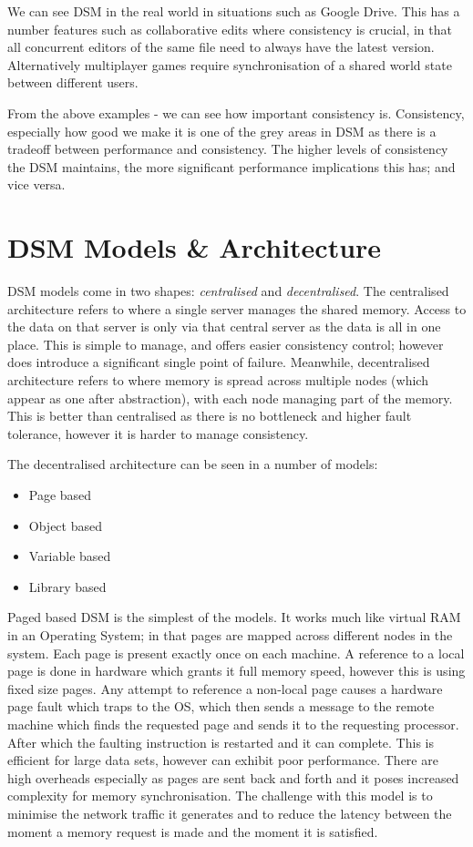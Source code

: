 We can see DSM in the real world in situations such as Google Drive. This has a number features such as collaborative edits where consistency is crucial, in that all concurrent editors of the same file need to always have the latest version. Alternatively multiplayer games require synchronisation of a shared world state between different users. 

From the above examples - we can see how important consistency is. Consistency, especially how good we make it is one of the grey areas in DSM as there is a tradeoff between performance and consistency. The higher levels of consistency the DSM maintains, the more significant performance implications this has; and vice versa. 

\section{DSM Models \& Architecture}
DSM models come in two shapes: \textit{centralised} and \textit{decentralised}. The centralised architecture refers to where a single server manages the shared memory. Access to the data on that server is only via that central server as the data is all in one place. This is simple to manage, and offers easier consistency control; however does introduce a significant single point of failure. Meanwhile, decentralised architecture refers to where memory is spread across multiple nodes (which appear as one after abstraction), with each node managing part of the memory. This is better than centralised as there is no bottleneck and higher fault tolerance, however it is harder to manage consistency. 

The decentralised architecture can be seen in a number of models:
\begin{itemize}
    \item Page based
    \item Object based
    \item Variable based
    \item Library based
\end{itemize}

Paged based DSM is the simplest of the models. It works much like virtual RAM in an Operating System; in that pages are mapped across different nodes in the system. Each page is present exactly once on each machine. A reference to a local page is done in hardware which grants it full memory speed, however this is using fixed size pages. Any attempt to reference a non-local page causes a hardware page fault which traps to the OS, which then sends a message to the remote machine which finds the requested page and sends it to the requesting processor. After which the faulting instruction is restarted and it can complete. This is efficient for large data sets, however can exhibit poor performance. There are high overheads especially as pages are sent back and forth and it poses increased complexity for memory synchronisation. The challenge with this model is to minimise the network traffic it generates and to reduce the latency between the moment a memory request is made and the moment it is satisfied.

